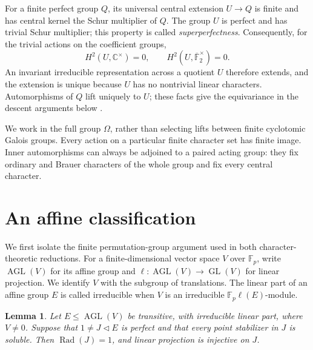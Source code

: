 \documentclass[11pt,a4paper]{amsart}
\newtheorem{lemma}[theorem]{Lemma}
\theoremstyle{remark}
\numberwithin{equation}{section}
\begin{document}
For a finite perfect group $Q$, its universal central extension
$U\longrightarrow Q$ is finite and has central kernel the Schur
multiplier of $Q$. The group $U$ is perfect and has trivial Schur
multiplier; this property is called \emph{superperfectness}.
Consequently, for the trivial actions on the coefficient groups,
\[
 H^2(U,\mathbb C^\times)=0,\qquad
 H^2(U,\overline{\mathbb F}_2^\times)=0.
\]
An invariant irreducible representation across a quotient $U$
therefore extends, and the extension is unique because $U$ has
no nontrivial linear characters. Automorphisms of $Q$ lift uniquely
to $U$; these facts give the equivariance in the descent arguments
below \cite{Brown}.

We work in the full group $\Omega$, rather than selecting lifts
between finite cyclotomic Galois groups. Every action on a particular
finite character set has finite image. Inner automorphisms can
always be adjoined to a paired acting group: they fix ordinary
and Brauer characters of the whole group and fix every central
character.


\section{An affine classification}
\label{sec:affine}

We first isolate the finite permutation-group argument used in both
character-theoretic reductions. For a finite-dimensional vector space $V$
over $\mathbb F_p$, write $\operatorname{AGL}(V)$ for its affine group and
$\ell:\operatorname{AGL}(V)\to\operatorname{GL}(V)$ for linear projection.
We identify $V$ with the subgroup of translations. The linear part of an
affine group $E$ is called irreducible when $V$ is an irreducible
$\mathbb F_p\ell(E)$-module.

\begin{lemma}\label{lemma:affine-radical}
Let $E\leq\operatorname{AGL}(V)$ be transitive, with irreducible linear part,
where $V\ne0$. Suppose that $1\ne J\triangleleft E$ is perfect and that
every point stabilizer in $J$ is soluble. Then
$\operatorname{Rad}(J)=1$, and linear projection is injective on $J$.
\end{lemma}
\end{document}
